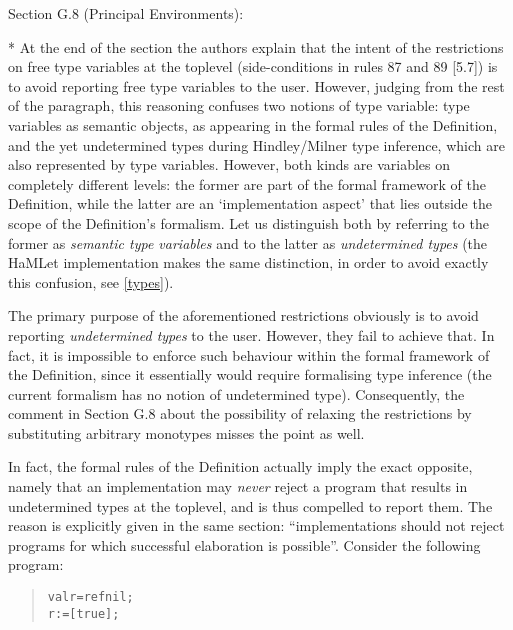 \documentclass[twoside,titlepage]{article}
\begin{document}
\begin{appendix}
Section G.8 (Principal Environments):

* At the end of the section the authors explain that the intent of the restrictions on free type variables at the toplevel (side-conditions in rules 87 and 89 [5.7]) is to avoid reporting free type variables to the user. However, judging from the rest of the paragraph, this reasoning confuses two notions of type variable: type variables as semantic objects, as appearing in the formal rules of the Definition, and the yet undetermined types during Hindley/Milner type inference, which are also represented by type variables. However, both kinds are variables on completely different levels: the former are part of the formal framework of the Definition, while the latter are an `implementation aspect' that lies outside the scope of the Definition's formalism. Let us distinguish both by referring to the former as {\em semantic type variables} and to the latter as {\em undetermined types} (the HaMLet implementation makes the same distinction, in order to avoid exactly this confusion, see \ref{types}).

The primary purpose of the aforementioned restrictions obviously is to avoid reporting {\em undetermined types} to the user. However, they fail to achieve that. In fact, it is impossible to enforce such behaviour within the formal framework of the Definition, since it essentially would require formalising type inference (the current formalism has no notion of undetermined type). Consequently, the comment in Section G.8 about the possibility of relaxing the restrictions by substituting arbitrary monotypes misses the point as well.

In fact, the formal rules of the Definition actually imply the exact opposite, namely that an implementation may {\em never} reject a program that results in undetermined types at the toplevel, and is thus compelled to report them. The reason is explicitly given in the same section: ``implementations should not reject programs for which successful elaboration is possible''. Consider the following program:

\begin{quote}
\begin{alltt}
val r = ref nil;
r := [true];
\end{alltt}
\end{quote}


\end{appendix}
\end{document}
